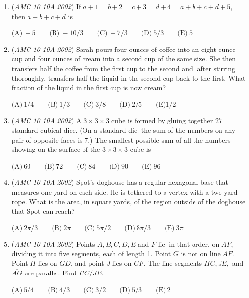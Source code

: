\begin{enumerate}
 $\text{(A)}\ 150 \qquad \text{(B)}\ 160 \qquad \text{(C)}\ 170 \qquad \text{(D)}\ 180 \qquad \text{(E)}\ 190$


	\item (\textit{AMC 10 10A 2002}) If $a + 1 = b + 2 = c + 3 = d + 4 = a + b + c + d + 5$, then $a + b + c + d$ is


 $\text{(A)}\ -5 \qquad \text{(B)}\ -10/3 \qquad \text{(C)}\ -7/3 \qquad \text{(D)}\ 5/3 \qquad \text{(E)}\ 5$


	\item (\textit{AMC 10 10A 2002}) Sarah pours four ounces of coffee into an eight-ounce cup and four ounces of cream into a second cup of the same size. She then transfers half the coffee from the first cup to the second and, after stirring thoroughly, transfers half the liquid in the second cup back to the first. What fraction of the liquid in the first cup is now cream?


 $\text{(A)}\ 1/4 \qquad \text{(B)}\ 1/3 \qquad \text{(C)}\ 3/8 \qquad \text{(D)}\ 2/5 \qquad \text{(E)} 1/2$


	\item (\textit{AMC 10 10A 2002}) A $3 \times 3 \times 3$ cube is formed by gluing together $27$ standard cubical dice. (On a standard die, the sum of the numbers on any pair of opposite faces is 7.) The smallest possible sum of all the numbers showing on the surface of the $3 \times 3 \times 3$ cube is


 $\text{(A)}\ 60 \qquad \text{(B)}\ 72 \qquad \text{(C)}\ 84 \qquad \text{(D)}\ 90 \qquad \text{(E)}\ 96$


	\item (\textit{AMC 10 10A 2002}) Spot's doghouse has a regular hexagonal base that measures one yard on each side. He is tethered to a vertex with a two-yard rope. What is the area, in square yards, of the region outside of the doghouse that Spot can reach?


 $\text{(A)}\ 2\pi/3 \qquad \text{(B)}\ 2\pi \qquad \text{(C)}\ 5\pi/2 \qquad \text{(D)}\ 8\pi/3 \qquad \text{(E)}\ 3\pi$


	\item (\textit{AMC 10 10A 2002}) Points $A,B,C,D,E$ and $F$ lie, in that order, on $\overline{AF}$, dividing it into five segments, each of length 1. Point $G$ is not on line $AF$. Point $H$ lies on $\overline{GD}$, and point $J$ lies on $\overline{GF}$. The line segments $\overline{HC}, \overline{JE},$ and $\overline{AG}$ are parallel. Find $HC/JE$.


 $\text{(A)}\ 5/4 \qquad \text{(B)}\ 4/3 \qquad \text{(C)}\ 3/2 \qquad \text{(D)}\ 5/3 \qquad \text{(E)}\ 2$



\end{enumerate}
